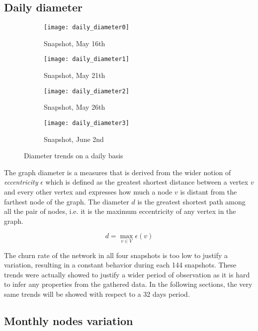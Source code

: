 	\subsection{Daily diameter}
	
		\begin{figure}[h]
		\centering
		\begin{subfigure}{0.45\textwidth}
			\centering
			\texttt{[image: daily\_diameter0]}
			\caption{Snapshot, May 16th}
			\label{daily_diameter0}
		\end{subfigure}
		\begin{subfigure}{0.45\textwidth}
			\centering
			\texttt{[image: daily\_diameter1]}
			\caption{Snapshot, May 21th}
			\label{daily_diameter1}
		\end{subfigure}
		\begin{subfigure}{0.45\textwidth}
			\centering
			\texttt{[image: daily\_diameter2]}
			\caption{Snapshot, May 26th}
			\label{daily_diameter2}
		\end{subfigure}
		\begin{subfigure}{0.45\textwidth}
			\centering
			\texttt{[image: daily\_diameter3]}
			\caption{Snapshot, June 2nd}
			\label{daily_diameter3}
		\end{subfigure}
		
		\caption{Diameter trends on a daily basis}
		\label{daily_diameter}
	\end{figure}
	
	The graph diameter is a measures that is derived from the wider notion of \textit{eccentricity} $\epsilon$ which is defined as the greatest shortest distance between a vertex \(v\) and every other vertex and expresses how much a node \(v\) is distant from the farthest node of the graph. The diameter \(d\) is the greatest shortest path among all the pair of nodes, i.e. it is the maximum eccentricity of any vertex in the graph.
	
	\[d = \max_{v \in V} \epsilon(v)\]
	
	The churn rate of the network in all four snapshots is too low to justify a variation, resulting in a constant behavior during each 144 snapshots. These trends were actually showed to justify a wider period of observation as it is hard to infer any properties from the gathered data. In the following sections, the very same trends will be showed with respect to a 32 days period. 

	\subsection{Monthly nodes variation}
	
